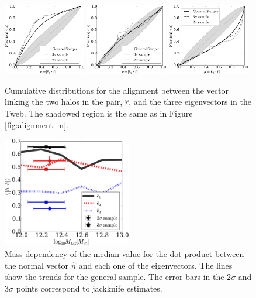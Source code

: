 \documentclass{emulateapj}
\begin{document}
\begin{figure}
\begin{center}
  \includegraphics[width=0.32\textwidth]{fig4a.pdf}
  \includegraphics[width=0.32\textwidth]{fig4b.pdf}
  \includegraphics[width=0.32\textwidth]{fig4c.pdf}
\end{center}
\caption{Cumulative distributions for the alignment between the vector
  linking the two halos in the pair, $\hat{r}$, and the three
  eigenvectors in the Tweb. The shadowed region is the same as in
  Figure \ref{fig:alignment_n}.
    \label{fig:alignment_r}}  
\end{figure}


\begin{figure}
\begin{center}
  \includegraphics[width=0.50\textwidth]{fig5.pdf}
\caption{Mass dependency of the median value for the dot product
  between the normal vector $\hat{n}$ and each one of the
  eigenvectors.  The lines show the trends for the general sample.
The error bars in the 2$\sigma$ and 3$\sigma$ points
  correspond to jackknife estimates. 
\label{fig:median_alignment_n}}
\end{center}
\end{figure}
\end{document}
